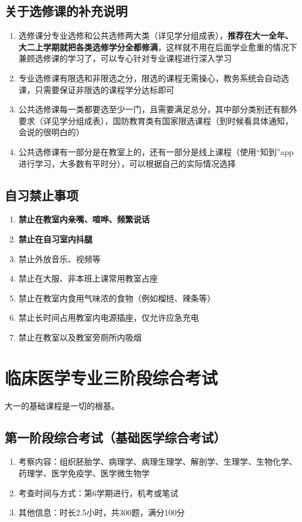 \subsection[关于选修课的补充说明]{关于选修课的补充说明}
\begin{enumerate}
    \item 选修课分专业选修和公共选修两大类（详见学分组成表），\textbf{推荐在大一全年、大二上学期就把各类选修学分全都修满}，这样就不用在后面学业愈重的情况下兼顾选修课的学习了，可以专心针对专业课程进行深入学习
    \item 专业选修课有限选和非限选之分，限选的课程无需操心，教务系统会自动选课，只需要保证非限选的课程学分达标即可
    \item 公共选修课每一类都要选至少一门，且需要满足总分，其中部分类别还有额外要求（详见学分组成表），国防教育类有国家限选课程（到时候看具体通知，会说的很明白的）
    \item 公共选修课有一部分是在教室上的，还有一部分是线上课程（使用“知到”app进行学习，大多数有平时分），可以根据自己的实际情况选择
\end{enumerate}

\subsection[自习禁止事项]{自习禁止事项}
\begin{enumerate}
    \item \textbf{禁止在教室内亲嘴、喧哗、频繁说话}
    \item \textbf{禁止在自习室内抖腿}
    \item 禁止外放音乐、视频等
    \item 禁止在大服、非本班上课常用教室占座
    \item 禁止在教室内食用气味浓的食物（例如榴梿、辣条等）
    \item 禁止长时间占用教室内电源插座，仅允许应急充电
    \item 禁止在教室以及教室旁厕所内吸烟
\end{enumerate}

\section[临床医学专业三阶段综合考试]{临床医学专业三阶段综合考试}
大一的基础课程是一切的根基。

\subsection[第一阶段综合考试（基础医学综合考试）]{第一阶段综合考试（基础医学综合考试）}
\begin{enumerate}
    \item 考察内容：组织胚胎学、病理学、病理生理学、解剖学、生理学、生物化学、药理学、医学免疫学、医学微生物学
    \item 考查时间与方式：第6学期进行，机考或笔试
    \item 其他信息：时长2.5小时，共300题，满分100分
\end{enumerate}

